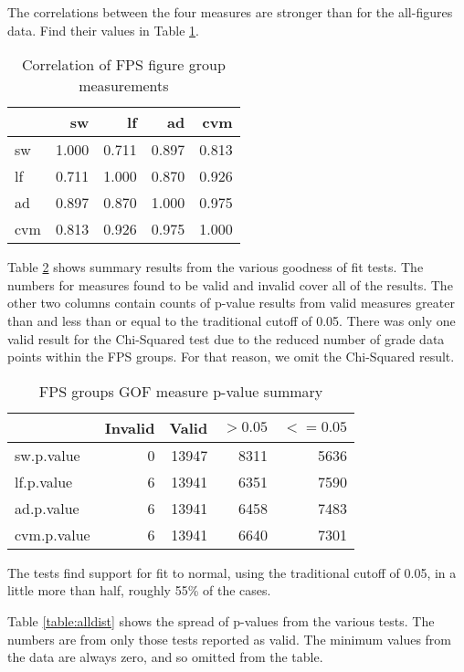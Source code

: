 The correlations between the four measures are stronger than for the
all-figures data.
Find their values in Table \ref{table:fpscorr}.

\begin{table}[tbp]
  \begin{tabular}{l | r r r r}
  & sw & lf & ad & cvm \\
   \hline
  sw   & 1.000  & 0.711  & 0.897   & 0.813 \\
  lf   & 0.711  & 1.000  & 0.870   & 0.926 \\
  ad   & 0.897  & 0.870  & 1.000   & 0.975 \\
  cvm  & 0.813  & 0.926  & 0.975   & 1.000 \\
  \end{tabular}
  \caption{Correlation of FPS figure group measurements}
  \label{table:fpscorr}
\end{table}

Table \ref{table:fpssumm} shows summary results from the various goodness
of fit tests.
The numbers for measures found to be valid and invalid cover all of the
results.
The other two columns contain counts of p-value results from valid measures
greater than and less than or equal to the traditional cutoff of 0.05.
There was only one valid result for the Chi-Squared test due to the
reduced number of grade data points within the FPS groups. For that reason,
we omit the Chi-Squared result.

\begin{table}[tbp]
\centering
\begin{tabular}{l | r r r r}
& Invalid & Valid & $> 0.05$ & $<= 0.05$ \\
 \hline
sw.p.value  & 0 & 13947 & 8311 & 5636 \\
lf.p.value  & 6 & 13941 & 6351 & 7590 \\
ad.p.value  & 6 & 13941 & 6458 & 7483 \\
cvm.p.value & 6 & 13941 & 6640 & 7301 \\
\end{tabular}
\caption{FPS groups GOF measure p-value summary}
\label{table:fpssumm}
\end{table}

The tests find support for fit to normal, using the traditional cutoff of
0.05, in a little more than half, roughly 55\% of the cases.

Table \ref{table:alldist} shows the spread of p-values from the various tests.
The numbers are from only those tests reported as valid.
The minimum values from the data are always zero, and so omitted from the table.

